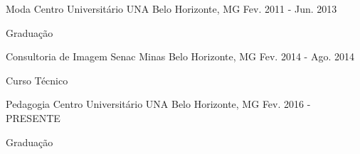 \begin{cventries}

  \cventry
    {Moda}
    {Centro Universitário UNA}
    {Belo Horizonte, MG}
    {Fev. 2011 - Jun. 2013}
    {
      \begin{cvitems}
        \item {Graduação}
      \end{cvitems}
    }

  \cventry
    {Consultoria de Imagem}
    {Senac Minas}
    {Belo Horizonte, MG}
    {Fev. 2014 - Ago. 2014}
    {
      \begin{cvitems}
        \item {Curso Técnico}
      \end{cvitems}
    }

  \cventry
    {Pedagogia}
    {Centro Universitário UNA}
    {Belo Horizonte, MG}
    {Fev. 2016 - PRESENTE}
    {
      \begin{cvitems}
        \item {Graduação}
      \end{cvitems}
    }
\end{cventries}
